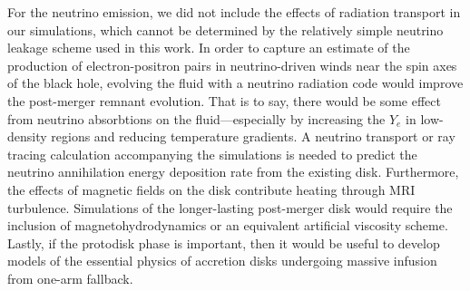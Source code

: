 For the neutrino emission, we did not include the effects of radiation transport in our simulations, which cannot be determined by the relatively simple neutrino leakage scheme used in this work.
In order to capture an estimate of the production of electron-positron pairs in neutrino-driven winds near the spin axes of the black hole, evolving the fluid with a neutrino radiation code would improve the post-merger remnant evolution.
That is to say, there would be some effect from neutrino absorbtions on the fluid---especially by increasing the $Y_e$ in low-density regions and reducing temperature gradients.
A neutrino transport or ray tracing calculation accompanying the simulations is needed to predict the neutrino annihilation energy deposition rate from the existing disk.
Furthermore, the effects of magnetic fields on the disk contribute heating through MRI turbulence.
Simulations of the longer-lasting post-merger disk would require the inclusion of magnetohydrodynamics or an equivalent artificial viscosity scheme. 
Lastly, if the protodisk phase is important, then it would be useful to develop models of the essential physics of accretion disks undergoing massive infusion from one-arm fallback.

